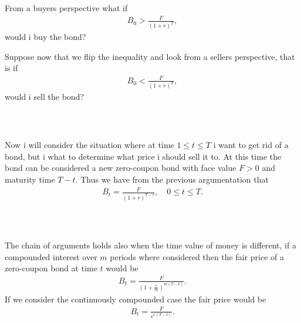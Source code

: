 \documentclass{beamer}
\numberwithin{equation}{section}
\begin{document}
\begin{frame}\frametitle{{\normalsize \secname} \\ {\large \subsecname}}
    From a buyers perspective what if
    \begin{align}\label{eq:zero_coupon_bond_example}
        B_0 > \frac{F}{(1 + r)^T},
    \end{align}
    would i buy the bond?
    \pause
    
    Suppose now that we flip the inequality and look from a sellers perspective, that is if
    \begin{align}\label{eq:zero_coupon_bond_example_seller}
        B_0 < \frac{F}{(1 + r)^T},
    \end{align}
    would i sell the bond?
\end{frame}

\begin{frame}\frametitle{{\normalsize \secname} \\ {\large \subsecname}}
    Now i will consider the situation where at time $1 \leq t \leq T$ i want to get rid of a bond, but i what to determine what price i should sell it to.
    At this time the bond can be considered a new zero-coupon bond with face value $F > 0$ and maturity time $T - t$.
    Thus we have from the previous argumentation that
    \begin{align}
        B_t = \frac{F}{(1 + r)^{T - t}}, \quad 0 \leq t \leq T.
    \end{align} 
\end{frame}

\begin{frame}\frametitle{{\normalsize \secname} \\ {\large \subsecname}}
    The chain of arguments holds also when the time value of money is different, if a compounded interest over $m$ periods where considered then the fair price of a zero-coupon bond at time $t$ would be
    \begin{align}
        B_t = \frac{F}{\left(1 + \frac{r}{m}\right)^{m(T - t)}}.
    \end{align}
    If we consider the continuously compounded case the fair price would be
    \begin{align}
        B_t = \frac{F}{e^{r(T -t)}}.
    \end{align}
\end{frame}
\end{document}
